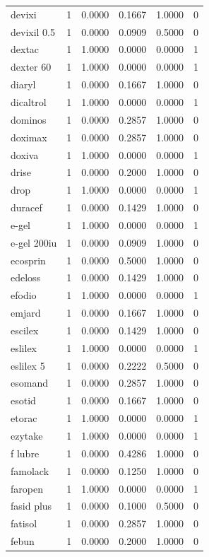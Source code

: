 \begin{longtable}{p{3.0cm}rrrrr}
devixi & 1 & 0.0000 & 0.1667 & 1.0000 & 0 \\
devixil 0.5 & 1 & 0.0000 & 0.0909 & 0.5000 & 0 \\
dextac & 1 & 1.0000 & 0.0000 & 0.0000 & 1 \\
dexter 60 & 1 & 1.0000 & 0.0000 & 0.0000 & 1 \\
diaryl & 1 & 0.0000 & 0.1667 & 1.0000 & 0 \\
dicaltrol & 1 & 1.0000 & 0.0000 & 0.0000 & 1 \\
dominos & 1 & 0.0000 & 0.2857 & 1.0000 & 0 \\
doximax & 1 & 0.0000 & 0.2857 & 1.0000 & 0 \\
doxiva & 1 & 1.0000 & 0.0000 & 0.0000 & 1 \\
drise & 1 & 0.0000 & 0.2000 & 1.0000 & 0 \\
drop & 1 & 1.0000 & 0.0000 & 0.0000 & 1 \\
duracef & 1 & 0.0000 & 0.1429 & 1.0000 & 0 \\
e-gel & 1 & 1.0000 & 0.0000 & 0.0000 & 1 \\
e-gel 200iu & 1 & 0.0000 & 0.0909 & 1.0000 & 0 \\
ecosprin & 1 & 0.0000 & 0.5000 & 1.0000 & 0 \\
edeloss & 1 & 0.0000 & 0.1429 & 1.0000 & 0 \\
efodio & 1 & 1.0000 & 0.0000 & 0.0000 & 1 \\
emjard & 1 & 0.0000 & 0.1667 & 1.0000 & 0 \\
escilex & 1 & 0.0000 & 0.1429 & 1.0000 & 0 \\
eslilex & 1 & 1.0000 & 0.0000 & 0.0000 & 1 \\
eslilex 5 & 1 & 0.0000 & 0.2222 & 0.5000 & 0 \\
esomand & 1 & 0.0000 & 0.2857 & 1.0000 & 0 \\
esotid & 1 & 0.0000 & 0.1667 & 1.0000 & 0 \\
etorac & 1 & 1.0000 & 0.0000 & 0.0000 & 1 \\
ezytake & 1 & 1.0000 & 0.0000 & 0.0000 & 1 \\
f lubre & 1 & 0.0000 & 0.4286 & 1.0000 & 0 \\
famolack & 1 & 0.0000 & 0.1250 & 1.0000 & 0 \\
faropen & 1 & 1.0000 & 0.0000 & 0.0000 & 1 \\
fasid plus & 1 & 0.0000 & 0.1000 & 0.5000 & 0 \\
fatisol & 1 & 0.0000 & 0.2857 & 1.0000 & 0 \\
febun & 1 & 0.0000 & 0.2000 & 1.0000 & 0 \\

\end{longtable}
